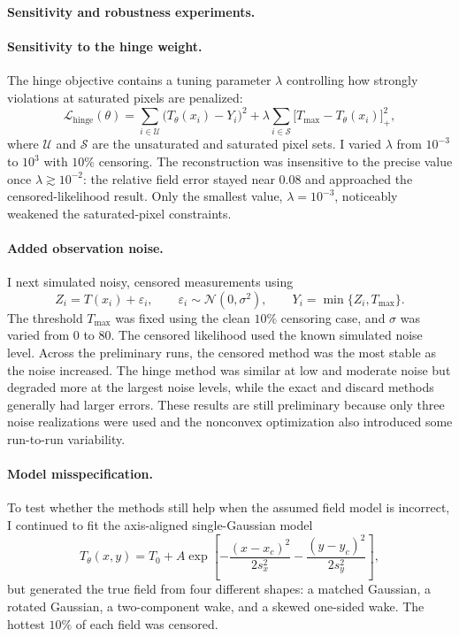 \item \textbf{Sensitivity and robustness experiments.}

\paragraph{Sensitivity to the hinge weight.}
The hinge objective contains a tuning parameter $\lambda$ controlling how
strongly violations at saturated pixels are penalized:
\[
    \mathcal L_{\mathrm{hinge}}(\theta)
    = \sum_{i\in\mathcal U}\bigl(T_\theta(x_i)-Y_i\bigr)^2
    + \lambda\sum_{i\in\mathcal S}
      \bigl[T_{\max}-T_\theta(x_i)\bigr]_+^2,
\]
where $\mathcal U$ and $\mathcal S$ are the unsaturated and saturated pixel
sets.  I varied $\lambda$ from $10^{-3}$ to $10^3$ with $10\%$ censoring.
The reconstruction was insensitive to the precise value once
$\lambda\gtrsim10^{-2}$: the relative field error stayed near $0.08$ and
approached the censored-likelihood result.  Only the smallest value,
$\lambda=10^{-3}$, noticeably weakened the saturated-pixel constraints.

\paragraph{Added observation noise.}
I next simulated noisy, censored measurements using
\[
    Z_i=T(x_i)+\varepsilon_i, \qquad
    \varepsilon_i\sim\mathcal N(0,\sigma^2), \qquad
    Y_i=\min\{Z_i,T_{\max}\}.
\]
The threshold $T_{\max}$ was fixed using the clean $10\%$ censoring case, and
$\sigma$ was varied from $0$ to $80$.  The censored likelihood used the known
simulated noise level.  Across the preliminary runs, the censored method was
the most stable as the noise increased.  The hinge method was similar at low
and moderate noise but degraded more at the largest noise levels, while the
exact and discard methods generally had larger errors.  These results are
still preliminary because only three noise realizations were used and the
nonconvex optimization also introduced some run-to-run variability.

\paragraph{Model misspecification.}
To test whether the methods still help when the assumed field model is
incorrect, I continued to fit the axis-aligned single-Gaussian model
\[
    T_\theta(x,y)=T_0+A\exp\!\left[-\frac{(x-x_c)^2}{2s_x^2}
                                  -\frac{(y-y_c)^2}{2s_y^2}\right],
\]
but generated the true field from four different shapes: a matched Gaussian,
a rotated Gaussian, a two-component wake, and a skewed one-sided wake.  The
hottest $10\%$ of each field was censored.

